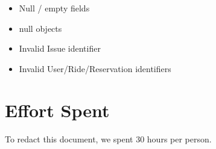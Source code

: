\documentclass{article}
\begin{document}
\begin{flushleft}
\begin{itemize}
\begin{itemize}
    \item Null / empty fields
    \item null objects
    \item Invalid Issue identifier
  \item Invalid User/Ride/Reservation identifiers
  \end{itemize}
  
  \end{itemize}
  
  
  \newpage		
  \section{Effort Spent} 		%
  
  To redact this document, we spent 30 hours per person.
  
  
  
  

 \end{flushleft}
\end{document}
